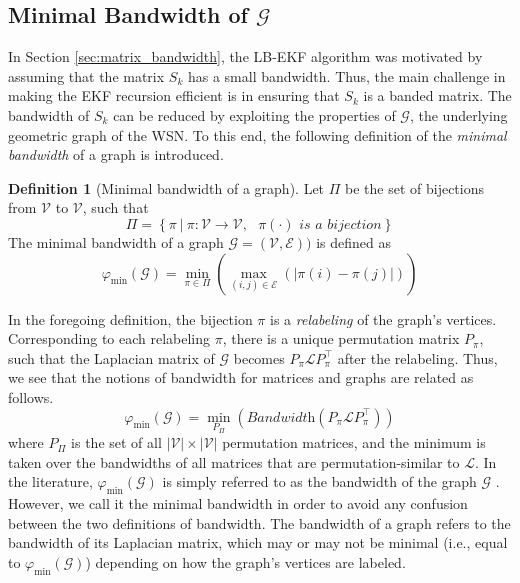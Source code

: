 \documentclass[twocolumn]{article}
\theoremstyle{plain}
\theoremstyle{definition}
\newtheorem*{definition}{Definition}
\theoremstyle{definition}
\theoremstyle{remark}
\begin{document}
\subsection{Minimal Bandwidth of $\mathcal G$}
\label{sec:graph_bandwidth}
In Section \ref{sec:matrix_bandwidth}, the LB-EKF algorithm was motivated by assuming that the matrix $S_k$ has a small bandwidth. Thus, the main challenge in making the EKF recursion efficient is in ensuring that $S_k$ is a banded matrix. The bandwidth of $S_{k}$ can be reduced by exploiting the properties of $\mathcal G$, the underlying geometric graph of the WSN. To this end, the following definition of the \textit{minimal bandwidth} of a graph is introduced.
\begin{definition}[Minimal bandwidth of a graph]
Let $\Pi$ be the set of bijections from $\mathcal V$ to $\mathcal V$, such that
\begin{equation}
    \Pi = \left \lbrace \pi\ \vert\ \pi:\mathcal V \rightarrow \mathcal V , \textit{ $\pi(\cdot)$ is a bijection} \right\rbrace
\end{equation}
The minimal bandwidth of a graph $\mathcal G=(\mathcal V , \mathcal E))$ is defined as
\begin{equation}
    \varphi _{\textrm{min}}(\mathcal G) = \min_{\pi \in \Pi}\left( \max_{(i,j)\in \mathcal E}(|\pi(i)-\pi(j)|) \right)
\end{equation}
\end{definition}
\noindent
In the foregoing definition, the bijection $\pi$ is a \textit{relabeling} of the graph's vertices. Corresponding to each relabeling $\pi$, there is a unique permutation matrix $P_\pi$, such that the Laplacian matrix of $\mathcal G$ becomes $P_\pi \mathcal L P_\pi ^\top$ after the relabeling. Thus, we see that the notions of bandwidth for matrices and graphs are related as follows.
\begin{equation}
    \varphi_{\textrm{min}} (\mathcal G) = \min_{P_\Pi}\left(\textit{Bandwidth}(P_\pi \mathcal L P_\pi^\top)\right)
\end{equation}
where $P_\Pi$ is the set of all $|\mathcal V|\times |\mathcal V|$ permutation matrices, and the minimum is taken over the bandwidths of all matrices that are permutation-similar to $\mathcal L$. In the literature, $\varphi _{\textrm{min}} (
\mathcal G )$ is simply referred to as the bandwidth of the graph $\mathcal G$ \cite{embedAndProject}. However, we call it the minimal bandwidth in order to avoid any confusion between the two definitions of bandwidth. The bandwidth of a graph refers to the bandwidth of its Laplacian matrix, which may or may not be minimal (i.e., equal to $\varphi _{\textrm{min}}(\mathcal G)$) depending on how the graph's vertices are labeled.
\end{document}

